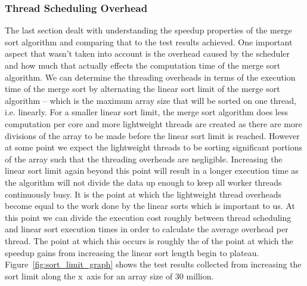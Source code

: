 \documentclass[12pt,twoside,notitlepage]{report}
\begin{document}
\subsubsection{Thread Scheduling Overhead}
The last section dealt with understanding the speedup properties of the merge sort algorithm and comparing that to the test results achieved. One important aspect that wasn't taken into account is the overhead caused by the scheduler
and how much that actually effects the computation time of the merge sort algorithm. We can determine the threading overheads in terms of the execution time of the merge sort by alternating the linear sort limit of the merge sort
algorithm -- which is the maximum array size that will be sorted on one thread, i.e. linearly. For a smaller linear sort limit, the merge sort algorithm does less computation per core and more lightweight threads are created as there
are more divisions of the array to be made before the linear sort limit is reached. However at some point we expect the lightweight threads to be sorting significant portions of the array such that the threading overheads are
negligible. Increasing the linear sort limit again beyond this point will result in a longer execution time as the algorithm will not divide the data up enough to keep all worker threads continuously busy. It is the point at which the
lightweight thread overheads become equal to the work done by the linear sorts which is important to us. At this point we can divide the execution cost roughly between thread scheduling and linear sort execution times in order to
calculate the average overhead per thread. The point at which this occurs is roughly the of the point at which the speedup gains from increasing the linear sort length begin to plateau. Figure~\ref{fig:sort_limit_graph} shows the test
results collected from increasing the sort limit along the x~axis for an array size of 30 million.
\end{document}
